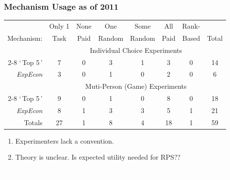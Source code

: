 
\begin{frame}
  \frametitle{Mechanism Usage as of 2011}
  \begin{center}
    {\footnotesize
        \begin{tabular}{r||c||c|c|c|c|c||c}
                                        & Only 1&None   &One    & Some   & All  & Rank- &      \\
        Mechanism:              & Task  &Paid   &Random & Random & Paid & Based & Total \\
        \hline
                                        & \multicolumn{7}{c}{Individual Choice Experiments}  \\
        \cline{2-8}
        `\,Top 5\,'         & 7    & 0      & 3   & 1       & 3   & 0         & 14   \\
        \emph{ExpEcon}   & 3    & 0      & 1   & 0       & 2   & 0         & 6 \\
        \hline
                                        & \multicolumn{7}{c}{Muti-Person (Game) Experiments}  \\
        \cline{2-8}
        `\,Top 5\,'         & 9    & 0      & 1   & 0       & 8   & 0         & 18   \\
        \emph{ExpEcon}   & 8    & 1      & 3   & 3       & 5   & 1         & 21 \\
        \hline\hline
        Totals                          & 27   & 1      & 8   & 4       & 18  & 1         & 59

        \end{tabular}
    }
  \end{center}
  \begin{enumerate}
    \item Experimenters lack a convention.
    \item Theory is unclear. Is expected utility needed for RPS??
  \end{enumerate}

\end{frame}



\begin{transitionframe}[c]
  \begin{center}{ \Huge \textcolor{white}{ACH 2018}}\end{center}
\end{transitionframe}

